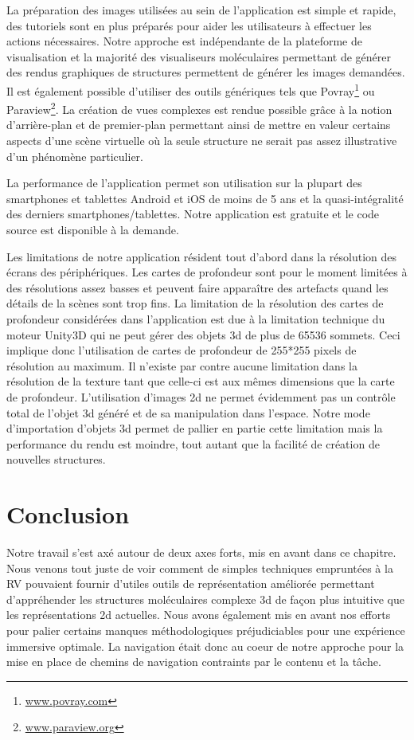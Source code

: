 La préparation des images utilisées au sein de l'application est simple et rapide, des tutoriels sont en plus préparés pour aider les utilisateurs à effectuer les actions nécessaires. Notre approche est indépendante de la plateforme de visualisation et la majorité des visualiseurs moléculaires permettant de générer des rendus graphiques de structures permettent de générer les images demandées. Il est également possible d'utiliser des outils génériques tels que Povray\footnote{\url{www.povray.com}} ou Paraview\footnote{\url{www.paraview.org}}. La création de vues complexes est rendue possible grâce à la notion d'arrière-plan et de premier-plan permettant ainsi de mettre en valeur certains aspects d'une scène virtuelle où la seule structure ne serait pas assez illustrative d'un phénomène particulier.

La performance de l'application permet son utilisation sur la plupart des smartphones et tablettes Android et iOS de moins de 5 ans et la quasi-intégralité des derniers smartphones/tablettes. Notre application est gratuite et le code source est disponible à la demande.

Les limitations de notre application résident tout d'abord dans la résolution des écrans des périphériques. Les cartes de profondeur sont pour le moment limitées à des résolutions assez basses et peuvent faire apparaître des artefacts quand les détails de la scènes sont trop fins. La limitation de la résolution des cartes de profondeur considérées dans l'application est due à la limitation technique du moteur Unity3D qui ne peut gérer des objets 3d de plus de 65536 sommets. Ceci implique donc l'utilisation de cartes de profondeur de 255*255 pixels de résolution au maximum. Il n'existe par contre aucune limitation dans la résolution de la texture tant que celle-ci est aux mêmes dimensions que la carte de profondeur. L'utilisation d'images 2d ne permet évidemment pas un contrôle total de l'objet 3d généré et de sa manipulation dans l'espace. Notre mode d'importation d'objets 3d permet de pallier en partie cette limitation mais la performance du rendu est moindre, tout autant que la facilité de création de nouvelles structures.

\section{Conclusion}

Notre travail s'est axé autour de deux axes forts, mis en avant dans ce chapitre. Nous venons tout juste de voir comment de simples techniques empruntées à la RV pouvaient fournir d'utiles outils de représentation améliorée permettant d'appréhender les structures moléculaires complexe 3d de façon plus intuitive que les représentations 2d actuelles.
Nous avons également mis en avant nos efforts pour palier certains manques méthodologiques préjudiciables pour une expérience immersive optimale. La navigation était donc au coeur de notre approche pour la mise en place de chemins de navigation contraints par le contenu et la tâche.

